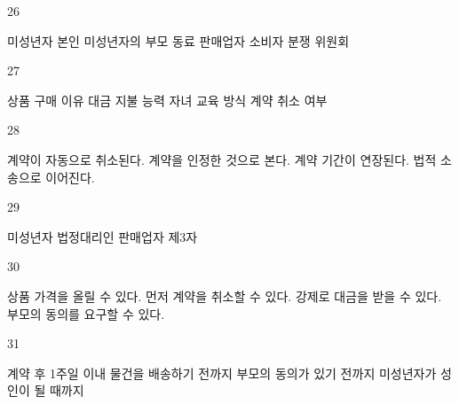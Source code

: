 \documentclass[fs9,seriesRus]{korfarm-base}
\begin{document}
\begin{kfSentenceUnit}{26}{}
\begin{kfChoices}
\kfChoice 미성년자 본인
\kfChoice 미성년자의 부모
\kfChoice 동료 판매업자
\kfChoice 소비자 분쟁 위원회
\end{kfChoices}
\end{kfSentenceUnit}

\begin{kfSentenceUnit}{27}{}
\begin{kfChoices}
\kfChoice 상품 구매 이유
\kfChoice 대금 지불 능력
\kfChoice 자녀 교육 방식
\kfChoice 계약 취소 여부
\end{kfChoices}
\end{kfSentenceUnit}

\begin{kfSentenceUnit}{28}{}
\begin{kfChoices}
\kfChoice 계약이 자동으로 취소된다.
\kfChoice 계약을 인정한 것으로 본다.
\kfChoice 계약 기간이 연장된다.
\kfChoice 법적 소송으로 이어진다.
\end{kfChoices}
\end{kfSentenceUnit}

\begin{kfSentenceUnit}{29}{}
\begin{kfChoices}
\kfChoice 미성년자
\kfChoice 법정대리인
\kfChoice 판매업자
\kfChoice 제3자
\end{kfChoices}
\end{kfSentenceUnit}

\begin{kfSentenceUnit}{30}{}
\begin{kfChoices}
\kfChoice 상품 가격을 올릴 수 있다.
\kfChoice 먼저 계약을 취소할 수 있다.
\kfChoice 강제로 대금을 받을 수 있다.
\kfChoice 부모의 동의를 요구할 수 있다.
\end{kfChoices}
\end{kfSentenceUnit}

\begin{kfSentenceUnit}{31}{}
\begin{kfChoices}
\kfChoice 계약 후 1주일 이내
\kfChoice 물건을 배송하기 전까지
\kfChoice 부모의 동의가 있기 전까지
\kfChoice 미성년자가 성인이 될 때까지
\end{kfChoices}
\end{kfSentenceUnit}
\end{document}
